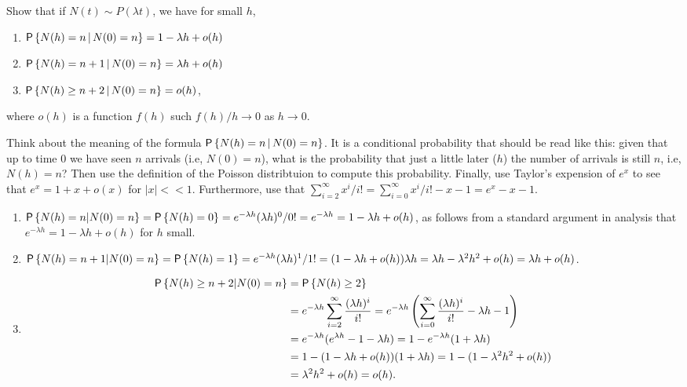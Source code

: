 \begin{question}
  Show that if $N(t) \sim P(\lambda t)$, we have for small $h$,
  \begin{enumerate}
  \item $\P{N(h) = n \given N(0) = n} = 1-\lambda h + o(h)$ 
  \item $\P{N(h) = n+1 \given N(0) = n} = \lambda h + o(h)$ 
  \item $\P{N(h) \geq n+2 \given N(0) = n} = o(h)$,
  \end{enumerate}
 where $o(h)$ is a function
    $f(h)$ such $f(h)/h \to 0$ as $h\to 0$.

    \begin{hint}
    Think about the meaning of the formula
      $\P{N(h) = n \given N(0) = n}$. It is a conditional probability
      that should be read like this: given that up to time $0$ we have
      seen $n$ arrivals (i.e, $N(0)=n$), what is the probability that
      just a little later ($h$) the number of arrivals is still $n$,
      i.e, $N(h)=n$? Then use the definition of the Poisson
      distribtuion to compute this probability. Finally, use Taylor's
      expension of $e^{x}$ to see that $e^{x} = 1 +x + o(x)$ for
      $|x| << 1$.  Furthermore, use that
      $\sum_{i=2}^\infty x^i/i! = \sum_{i=0}^\infty x^i/i! - x -1 = e^x -x 
      - 1$.
    \end{hint}

\begin{solution}

\begin{enumerate}
  \item 
  $\P{N(h) = n | N(0) = n} = \P{N(h) = 0} = e^{-\lambda h} (\lambda
  h)^0/0! = e^{-\lambda h} = 1-\lambda h + o(h)$,
  as follows from a standard argument in analysis that
  $e^{-\lambda h} = 1 -\lambda h + o(h)$  for $h$ small. 
\item 
  $\P{N(h) = n +1 | N(0) = n} = \P{N(h) = 1} = e^{-\lambda h} (\lambda h)^1/1! = 
(1-\lambda h + o(h))\lambda h  = \lambda h - \lambda^2 h^2 + o(h) = \lambda h + o(h)$. 
\item 
  \begin{equation*}
    \begin{split}
  \P{N(h) \geq n+2 | N(0) = n} 
&= \P{N(h) \geq 2} \\
&= e^{-\lambda h} \sum_{i=2}^\infty \frac{(\lambda h)^i}{i!} 
= e^{-\lambda h} \left(\sum_{i=0}^\infty \frac{(\lambda h)^i}{i!} - \lambda h - 1\right)\\
&= e^{-\lambda h}(e^{\lambda h} - 1 - \lambda h) 
= 1 - e^{-\lambda h}(1 + \lambda h) \\
&= 1 - (1-\lambda h + o(h))(1+\lambda h) 
= 1 - (1-\lambda^2 h^2 + o(h)) \\
&= \lambda^2 h^2 + o(h) = o(h).
    \end{split}
  \end{equation*}


\end{enumerate}
\end{solution}
\end{question}
